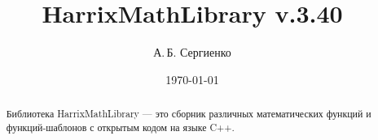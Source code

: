 \documentclass[a4paper,12pt]{article}
\title{HarrixMathLibrary v.3.40}
\author{А.\,Б. Сергиенко}
\date{\today}
\begin{document}


\maketitle

\begin{abstract}
Библиотека HarrixMathLibrary --- это сборник различных математических функций и функций-шаблонов с открытым кодом на языке C++.
\end{abstract}

\tableofcontents
\end{document}
